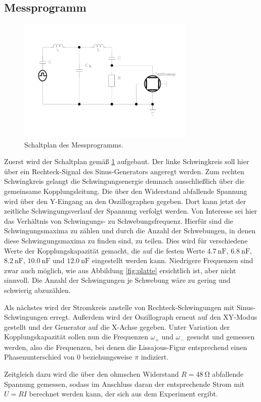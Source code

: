 \subsection{Messprogramm}
\begin{figure}
    \centering
    \includegraphics[width=0.75\textwidth]{plots/gekop_schw_kreis3.pdf}
    \caption{Schaltplan des Messprogramms.}
    \label{fig:messung_schweb}
\end{figure}
Zuerst wird der Schaltplan gemäß \ref{fig:messung_schweb} aufgebaut. 
Der linke Schwingkreis soll hier über ein Rechteck-Signal des Sinus-Generators angeregt werden. 
Zum rechten Schwingkreis gelangt die Schwingungsenergie demnach ausschließlich über die gemeinsame Kopplungsleitung. 
Die über den Widerstand abfallende Spannung wird über den Y-Eingang an den Oszillographen gegeben. 
Dort kann jetzt der zeitliche Schwingungsverlauf der Spannung verfolgt werden. 
Von Interesse sei hier das Verhältnis von Schwingungs- zu Schwebungsfrequenz. 
Hierfür sind die Schwingungsmaxima zu zählen und durch die Anzahl der Schwebungen, in denen diese Schwingungsmaxima zu finden 
sind, zu teilen. 
Dies wird für verschiedene Werte der Kopplungskapazität gemacht, die auf die festen Werte $\SI{4.7}{\nano\farad}$, 
$\SI{6.8}{\nano\farad}$, $\SI{8.2}{\nano\farad}$, $\SI{10.0}{\nano\farad}$ und $\SI{12.0}{\nano\farad}$ eingestellt werden kann.
Niedrigere Frequenzen sind zwar auch möglich, wie aus Abbildung \ref{fig:platte} ersichtlich ist, aber nicht sinnvoll. 
Die Anzahl der Schwingungen je Schwebung wäre zu gering und schwierig abzuzählen. 

Als nächstes wird der Stromkreis anstelle von Rechteck-Schwingungen mit Sinus-Schwingungen erregt. 
Außerdem wird der Oszillograph erneut auf den XY-Modus gestellt und der Generator auf die X-Achse gegeben. 
Unter Variation der Kopplungskapazität sollen nun die Frequenzen $\omega _+$ und $\omega _-$ gesucht und gemessen werden, 
also die Frequenzen, bei denen die Lissajous-Figur entsprechend einen Phasenunterschied von $0$ beziehungsweise $\pi$ indiziert. 

Zeitgleich dazu wird die über den ohmschen Widerstand $R=\SI{48}{\ohm}$ abfallende Spannung gemessen, sodass im Anschluss 
daran der entsprechende Strom mit $U=RI$ berechnet werden kann, der sich aus dem Experiment ergibt. 